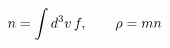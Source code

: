 \documentclass[preview]{standalone}
\begin{document}
\begin{align*}
\special{dvisvgm:raw <g id='unique000'>}n=\int d^3v\,f,\qquad \rho=mn\special{dvisvgm:raw </g>}
\end{align*}
\end{document}
